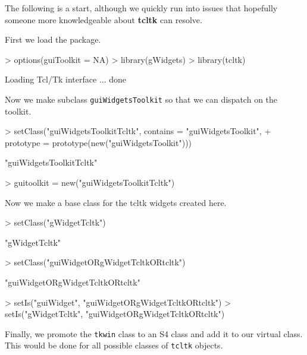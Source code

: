 \documentclass[12pt]{article}
\newcommand{\RCode}[1]{\texttt{#1}}
\newcommand{\RPackage}[1]{\textbf{#1}}
\begin{document}
The following is a start, although we quickly run into issues
that hopefully someone more knowledgeable about \RPackage{tcltk} can
resolve.


First we load the package.
\begin{Schunk}
\begin{Sinput}
> options(guiToolkit = NA)
> library(gWidgets)
> library(tcltk)
\end{Sinput}
\begin{Soutput}
Loading Tcl/Tk interface ... done
\end{Soutput}
\end{Schunk}

Now we make subclass \RCode{guiWidgetsToolkit} so that we can dispatch
on the toolkit.
\begin{Schunk}
\begin{Sinput}
> setClass("guiWidgetsToolkitTcltk", contains = "guiWidgetsToolkit", 
+     prototype = prototype(new("guiWidgetsToolkit")))
\end{Sinput}
\begin{Soutput}
[1] "guiWidgetsToolkitTcltk"
\end{Soutput}
\begin{Sinput}
> guitoolkit = new("guiWidgetsToolkitTcltk")
\end{Sinput}
\end{Schunk}

Now we make a base class for the tcltk widgets created here.
\begin{Schunk}
\begin{Sinput}
> setClass("gWidgetTcltk")
\end{Sinput}
\begin{Soutput}
[1] "gWidgetTcltk"
\end{Soutput}
\begin{Sinput}
> setClass("guiWidgetORgWidgetTcltkORtcltk")
\end{Sinput}
\begin{Soutput}
[1] "guiWidgetORgWidgetTcltkORtcltk"
\end{Soutput}
\begin{Sinput}
> setIs("guiWidget", "guiWidgetORgWidgetTcltkORtcltk")
> setIs("gWidgetTcltk", "guiWidgetORgWidgetTcltkORtcltk")
\end{Sinput}
\end{Schunk}

Finally, we promote the \RCode{tkwin} class to an S4 class and add it
to our virtual class. This would be done for all possible classes of
\RCode{tcltk} objects.
\end{document}
